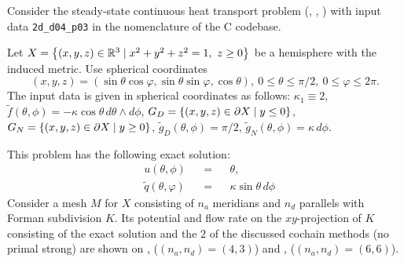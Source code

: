 \begin{example}
  \label{idec/diffusion/continuous/steady_state/examples/2d_d04_p03-example}
  Consider the steady-state continuous heat transport problem
  (,
   ,
   )
  with input data \verb|2d_d04_p03| in the nomenclature of the C codebase.

  Let $X = \left\{ (x, y, z) \in \mathbb{R}^3 \mid x^2 + y^2 + z^2 = 1,\ z \geq 0 \right\}$ be a
  hemisphere with the induced metric.
  Use spherical coordinates
  \begin{equation}
    (x, y, z)
    = (\sin \theta \cos \varphi, \sin \theta \sin \varphi, \cos \theta),\
    0 \leq \theta \leq \pi / 2,\
    0 \leq \varphi \leq 2 \pi.
  \end{equation}
  The input data is given in spherical coordinates as follows:
    $\kappa_1 \equiv 2$,
    $\tilde{f}(\theta, \phi) = - \kappa \cos \theta\, d \theta \wedge d \phi$,
    $G_D = \left\{ (x, y, z) \in \partial X \mid y \leq 0 \right\}$,
    $G_N = \left\{ (x, y, z) \in \partial X \mid y \geq 0 \right\}$,
    $\tilde{g}_D(\theta, \phi) = \pi / 2$,
    $\tilde{g}_N(\theta, \phi) = \kappa\, d \phi$.

  This problem has the following exact solution:
  \begin{subequations}
    \begin{alignat}{3}
      & u(\theta, \phi) && = && \theta, \\
      & \tilde{q}(\theta, \varphi) && = && \kappa \sin \theta\, d \phi
    \end{alignat}
  \end{subequations}
  Consider a mesh $M$ for $X$ consisting of $n_a$ meridians and $n_d$ parallels
  with Forman subdivision $K$.
  Its potential and flow rate on the $xy$-projection of $K$ consisting of the
  exact solution and the $2$ of the discussed cochain methods (no primal strong)
  are shown on
  ,
  ($(n_a, n_d) = (4, 3)$)
  and
  ,
  ($(n_a, n_d) = (6, 6)$).
\end{example}
